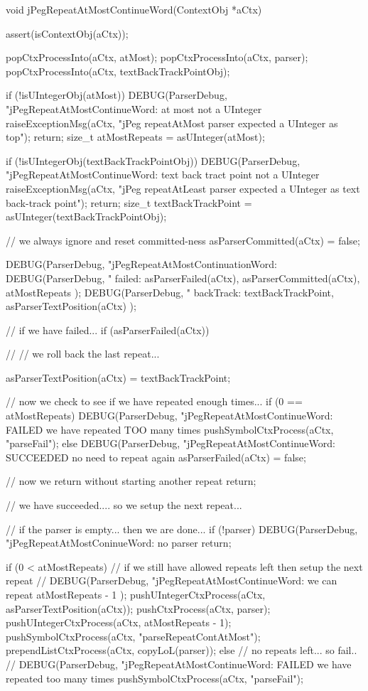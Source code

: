 \startCCode
void jPegRepeatAtMostContinueWord(ContextObj *aCtx) {
  assert(isContextObj(aCtx));

  popCtxProcessInto(aCtx, atMost);
  popCtxProcessInto(aCtx, parser);
  popCtxProcessInto(aCtx, textBackTrackPointObj);

  if (!isUIntegerObj(atMost)) {
    DEBUG(ParserDebug,
      "jPegRepeatAtMostContinueWord: at most not a UInteger%
    raiseExceptionMsg(aCtx,
      "jPeg repeatAtMost parser expected a UInteger as top");
    return;
  }
  size_t atMostRepeats = asUInteger(atMost);

  if (!isUIntegerObj(textBackTrackPointObj)) {
    DEBUG(ParserDebug,
      "jPegRepeatAtMostContinueWord: text back tract point not a UInteger%
    raiseExceptionMsg(aCtx,
      "jPeg repeatAtLeast parser expected a UInteger as text back-track point");
    return;
  }
  size_t textBackTrackPoint = asUInteger(textBackTrackPointObj);

  // we always ignore and reset committed-ness
  asParserCommitted(aCtx) = false;

  DEBUG(ParserDebug,
    "jPegRepeatAtMostContinuationWord:%
  DEBUG(ParserDebug,
    "  failed: %
    asParserFailed(aCtx), asParserCommitted(aCtx),
    atMostRepeats
  );
  DEBUG(ParserDebug,
    "  backTrack: %
    textBackTrackPoint, asParserTextPosition(aCtx)
  );
  
  // if we have failed...
  if (asParserFailed(aCtx)) {
    //
    // we roll back the last repeat...

    asParserTextPosition(aCtx) = textBackTrackPoint;
       
    // now we check to see if we have repeated enough times...
    if (0 == atMostRepeats) {
      DEBUG(ParserDebug,
        "jPegRepeatAtMostContinueWord: FAILED we have repeated TOO many times%
      pushSymbolCtxProcess(aCtx, "parseFail");
    } else {
      DEBUG(ParserDebug,
        "jPegRepeatAtMostContinueWord: SUCCEEDED no need to repeat again%
     asParserFailed(aCtx) = false;
    }
    
    // now we return without starting another repeat
    return;
  }
  
  // we have succeeded.... so we setup the next repeat...
  
  // if the parser is empty... then we are done...
  if (!parser) { 
    DEBUG(ParserDebug, "jPegRepeatAtMostConinueWord: no parser%
    return;
  }

  if (0 < atMostRepeats) {
    // if we still have allowed repeats left then setup the next repeat
    //
    DEBUG(ParserDebug,
      "jPegRepeatAtMostContinueWord: we can repeat %
      atMostRepeats - 1 
    );
    pushUIntegerCtxProcess(aCtx, asParserTextPosition(aCtx));
    pushCtxProcess(aCtx, parser);
    pushUIntegerCtxProcess(aCtx, atMostRepeats - 1);
    pushSymbolCtxProcess(aCtx, "parseRepeatContAtMost");
    prependListCtxProcess(aCtx, copyLoL(parser));
  } else {
    // no repeats left... so fail..
    //
    DEBUG(ParserDebug,
      "jPegRepeatAtMostContinueWord: FAILED we have repeated too many times%
    pushSymbolCtxProcess(aCtx, "parseFail");
  }
}
\stopCCode

